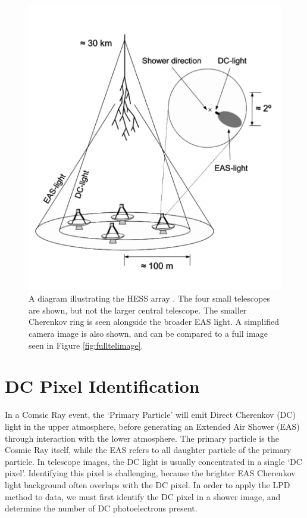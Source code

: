 \documentclass[11pt]{article}
\begin{document}
\begin{figure}
\begin{center}
\includegraphics[height=0.3\textheight]{hessdiagram}
\caption{A diagram illustrating the HESS array \cite{hess07}. The four small telescopes are shown, but not the larger central telescope. The smaller Cherenkov ring is seen alongside the broader EAS light. A simplified camera image is also shown, and can be compared to a full image seen in Figure \ref{fig:fulltelimage}.}
\label{fig:hessdiagram}
\end{center}
\end{figure}

\section{DC Pixel Identification}
In a Comsic Ray event, the \textquoteleft Primary Particle' will emit Direct Cherenkov (DC) light in the upper atmosphere, before generating an Extended Air Shower (EAS) through interaction with the lower atmosphere. The primary particle is the Cosmic Ray itself, while the EAS refers to all daughter particle of the primary particle. In telescope images, the DC light is usually concentrated in a single  \textquoteleft DC pixel'. Identifying this pixel is challenging, because the brighter EAS Cherenkov light background often overlaps with the DC pixel. In order to apply the LPD method to data, we must first identify the DC pixel in a shower image, and determine the number of DC photoelectrons present. 
\end{document}
